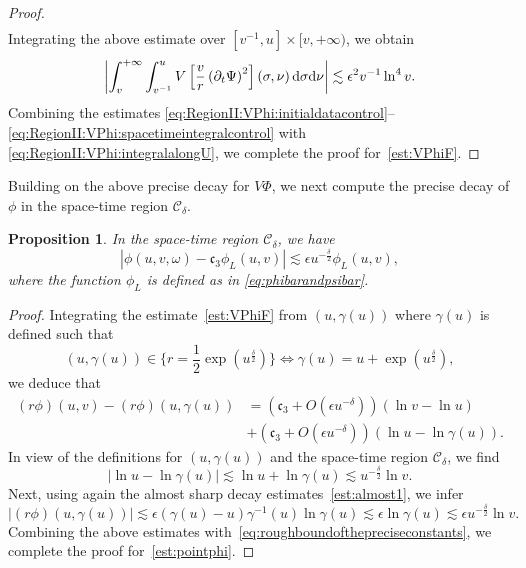 \documentclass[a4paper,reqno]{amsart}
\newtheorem{proposition}[theorem]{Proposition}
\theoremstyle{definition}
\numberwithin{equation}{section}
\def \d {{\rm{d}}}
\def \pt{\partial_{t}}
\def\ep{\epsilon}
\def\lab{\label}
\begin{document}
\begin{proof}
\begin{equation*}
\begin{aligned}
\end{aligned}
\end{equation*}
Integrating the above estimate over $ [v^{-1},u]\times
[v,+\infty)$, we obtain
\begin{equation}
\lab{eq:RegionII:VPhi:spacetimeintegralcontrol}
\left|\int_{v}^{+\infty}\int_{v^{-1}}^{u}V\left[\frac{v}{r}\left(\pt \Psi\right)^{2}\right]\left(\sigma,\nu\right)\d \sigma \d \nu\right|\lesssim \ep^{2} v^{-1}\ln^4 v.
\end{equation}
Combining the estimates \eqref{eq:RegionII:VPhi:initialdatacontrol}--\eqref{eq:RegionII:VPhi:spacetimeintegralcontrol} with \eqref{eq:RegionII:VPhi:integralalongU},
 we complete the proof for~\eqref{est:VPhiF}.
\end{proof}

Building on the above precise decay for $V\Phi$, we next compute the precise decay of $\phi$ in the space-time region $\mathcal{C}_{\delta}$.

\begin{proposition}\label{prop:pointphi}
In the space-time region $\mathcal{C}_{\delta}$, we have
\begin{equation}\label{est:pointphi}
\left|\phi(u,v,\omega)-\mathfrak{c}_{3}\phi_{L}(u,v)\right|\lesssim \epsilon u^{-\frac{\delta}{2}} {\phi_{L}}(u,v),
\end{equation}
where the function $\phi_{L}$ is defined as in \eqref{eq:phibarandpsibar}.
\end{proposition}

\begin{proof}
Integrating the estimate~\eqref{est:VPhiF} from $(u,\gamma(u))$ where $\gamma(u)$ is defined such that
\begin{equation*}
(u,\gamma(u))\in\{r=\frac{1}{2}\exp(u^{\frac{\delta}{2}})\}\Longleftrightarrow
\gamma(u)=u+\exp (u^{\frac{\delta}{2}}),
\end{equation*}
we deduce that
\begin{equation*}
\begin{aligned}
(r\phi)(u,v)-(r\phi)(u,\gamma(u))
&=({\mathfrak{c}}_{3}+O(\ep u^{-\delta}))(\ln v-\ln u)\\
&+({\mathfrak{c}}_{3}+O(\ep u^{-\delta}))(\ln u-\ln \gamma(u)).
\end{aligned}
\end{equation*}
In view of the definitions for $(u,\gamma(u))$ and the space-time region $\mathcal{C}_{\delta}$, we find 
\begin{equation*}
    |\ln u-\ln \gamma(u)|\lesssim \ln u+\ln \gamma(u)\lesssim u^{-\frac{\delta}{2}}\ln v.
\end{equation*}
Next, using again the almost sharp decay estimates~\eqref{est:almost1}, we infer
\begin{equation*}
\left|(r\phi)(u,\gamma(u))\right|
\lesssim \epsilon (\gamma(u)-u)\gamma^{-1}(u)\ln \gamma(u)
\lesssim \epsilon \ln \gamma(u)\lesssim \epsilon u^{-\frac{\delta}{2}}\ln v.
\end{equation*}
Combining the above estimates with~\eqref{eq:roughboundofthepreciseconstants}, we complete the proof for~\eqref{est:pointphi}.
\end{proof}
\end{document}
